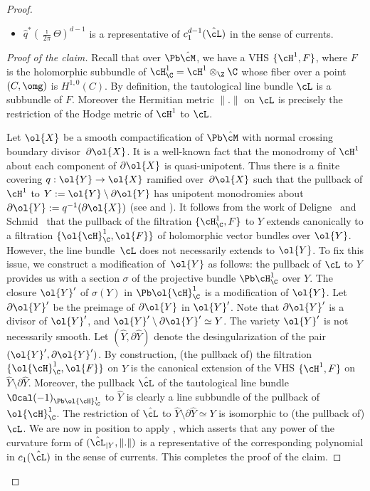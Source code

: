 \begin{proof}
\begin{Claim}
\begin{itemize}
\item $\hat{q}^*(\frac{\imath}{2\pi}\Theta)^{d-1}$ is a representative of $c^{d-1}_1(\hat{\cL})$ in the sense of currents.
\end{itemize}
\end{Claim}
\begin{proof}[Proof of the claim]
Recall that over $\Pb\hat{\cM}$, we have a VHS $\{\cH^1, F\}$, where $F$ is the holomorphic subbundle of $\cH^1_{\C}=\cH^1\otimes_{\Z}\C$ whose fiber over a point $(C,\omg)$ is $H^{1,0}(C)$. By definition, the tautological line bundle $\cL$ is a subbundle of $F$. Moreover the Hermitian metric $\|.\|$ on $\cL$ is precisely the restriction of the Hodge metric of $\cH^1$ to $\cL$.

Let $\ol{X}$ be a smooth compactification of $\Pb\hat{\cM}$ with normal crossing boundary divi\-sor~$\partial \ol{X}$. It is a well-known fact that the monodromy of $\cH^1$ about each component of $\partial \ol{X}$ is quasi-unipotent. Thus there is a finite covering $q: \ol{Y} \to \ol{X}$ ramified over~$\partial \ol{X}$ such that the pullback of $\cH^1$ to $Y:=\ol{Y}\setminus \partial\ol{Y}$ has unipotent monodromies about $\partial \ol{Y}:=q^{-1}(\partial \ol{X})$ (see \cite[Th.\,17]{Kaw81} and \cite[Lem.\,3.5]{Bru18}). It follows from the work of Deligne~\cite{Del70} and Schmid~\cite{Sch73} that the pullback of the filtration $\{\cH^1_{\C},F\}$ to $Y$ extends canonically to a filtration $\{\ol{\cH}^1_{\C}, \ol{F}\}$ of holomorphic vector bundles over $\ol{Y}$.
However, the line bundle~$\cL$ does not necessarily extends to $\ol{Y}$.
To fix this issue, we construct a modification of~$\ol{Y}$ as follows: the pullback of $\cL$ to $Y$ provides us with a section $\sigma$ of the projective bundle $\Pb\cH^1_{\C}$ over $Y$. The closure $\ol{Y}'$ of $\sigma(Y)$ in $\Pb\ol{\cH}^1_{\C}$ is a modification of $\ol{Y}$. Let $\partial \ol{Y}'$ be the preimage of $\partial \ol{Y}$ in $\ol{Y}'$. Note that $\partial\ol{Y}'$ is a divisor of $\ol{Y}'$, and $\ol{Y}'\setminus\partial\ol{Y}'\simeq Y$. The variety $\ol{Y}'$ is not necessarily smooth. Let $(\hat{Y},\partial\hat{Y})$ denote the desingularization of the pair $(\ol{Y}',\partial \ol{Y}')$. By construction, (the pullback of) the filtration $\{\ol{\cH}^1_{\C}, \ol{F}\}$ on $\hat{Y}$ is the canonical extension of the VHS $\{\cH^1,F\}$ on $\hat{Y}\setminus\partial\hat{Y}$. Moreover, the pullback $\hat{\cL}$ of the tautological line bundle $\Ocal(-1)_{\Pb\ol{\cH}^1_{\C}}$ to $\hat{Y}$ is clearly a line subbundle of the pullback of~$\ol{\cH}^1_{\C}$.
The restriction of $\hat{\cL}$ to $\hat{Y}\setminus\partial\hat{Y}\simeq Y$ is isomorphic to (the pullback of) $\cL$.
We are now in position to apply \cite[Th.\,5.1 and Remark 5.19]{Kollar87}, which asserts that any power of the curvature form of $(\hat{\cL}_{|Y}, \|.\|)$ is a representative of the corresponding polynomial in $c_1(\hat{\cL})$ in the sense of currents. This completes the proof of the claim.
\end{proof}


\end{proof}
